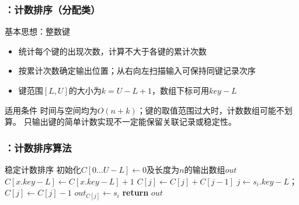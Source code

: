 \begin{frame}
    \frametitle{\insertsectionhead：计数排序（分配类）}
    \begin{block}{基本思想：整数键}
        \begin{itemize}
            \item 统计每个键的出现次数，计算不大于各键的累计次数
            \item 按累计次数确定输出位置；从右向左扫描输入可保持同键记录次序
            \item 键范围$[L,U]$的大小为$k=U-L+1$，数组下标可用$key-L$
        \end{itemize}
    \end{block}
    \begin{alertblock}{适用条件}
        时间与空间均为$O(n+k)$；键的取值范围过大时，计数数组可能不划算。
        只输出键的简单计数实现不一定能保留关联记录或稳定性。
    \end{alertblock}
\end{frame}

\begin{fragile}
    \frametitle{\insertsectionhead：计数排序算法}
    \begin{algorithmx}{稳定计数排序}
        \State 初始化$C[0\ldots U-L]\gets0$及长度为$n$的输出数组$out$
        \State $C[x.key-L]\gets C[x.key-L]+1$
        \EndFor
        \State $C[j]\gets C[j]+C[j-1]$
        \EndFor
        \State $j\gets s_i.key-L$；$C[j]\gets C[j]-1$
        \State $out_{C[j]}\gets s_i$
        \EndFor
        \State \textbf{return} $out$
        \EndProcedure
    \end{algorithmx}
\end{fragile}

